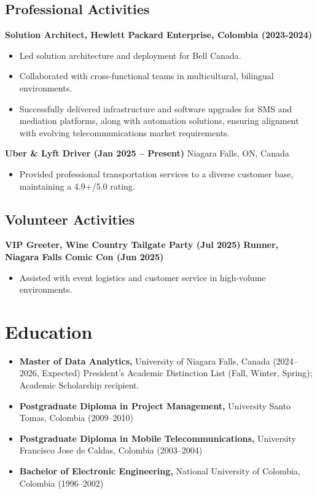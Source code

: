 \documentclass[a4paper,10pt]{article}
\begin{document}
\subsection*{Professional Activities}

\textbf{Solution Architect, Hewlett Packard Enterprise, Colombia (2023-2024)}
\begin{itemize}
    \item Led solution architecture and deployment for Bell Canada.
    \item Collaborated with cross-functional teams in multicultural, bilingual environments.
    \item Successfully delivered infrastructure and software upgrades for SMS and mediation platforms, along with automation solutions, ensuring alignment with evolving telecommunications market requirements.
\end{itemize}

\textbf{Uber \& Lyft Driver (Jan 2025 – Present)}
Niagara Falls, ON, Canada
\begin{itemize}
    \item Provided professional transportation services to a diverse customer base, maintaining a 4.9+/5.0 rating.
\end{itemize}

\subsection*{Volunteer Activities}
\textbf{VIP Greeter, Wine Country Tailgate Party (Jul 2025)}
\textbf{Runner, Niagara Falls Comic Con (Jun 2025)}
\begin{itemize}
    \item Assisted with event logistics and customer service in high-volume environments.
\end{itemize}

\section*{\textcolor{myblue}{Education}}
\begin{itemize}
    \item \textbf{Master of Data Analytics,} University of Niagara Falls, Canada (2024–2026, Expected)  
    President’s Academic Distinction List (Fall, Winter, Spring); Academic Scholarship recipient.
    
    \item \textbf{Postgraduate Diploma in Project Management,} University Santo Tomas, Colombia (2009–2010)
    
    \item \textbf{Postgraduate Diploma in Mobile Telecommunications,} University Francisco Jose de Caldas, Colombia (2003–2004)
    
    \item \textbf{Bachelor of Electronic Engineering,} National University of Colombia, Colombia (1996–2002)
\end{itemize}
\end{document}
